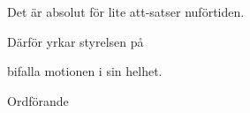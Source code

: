 \documentclass[../_main/handlingar.tex]{subfiles}
\begin{document}
\motionssvar

Det är absolut för lite att-satser nuförtiden.

Därför yrkar styrelsen på
\begin{attsatser}
    \att bifalla motionen i sin helhet.
\end{attsatser}

\begin{signatures}{1}
    \ist
    \signature{\ordf}{Ordförande}
\end{signatures}
\end{document}
